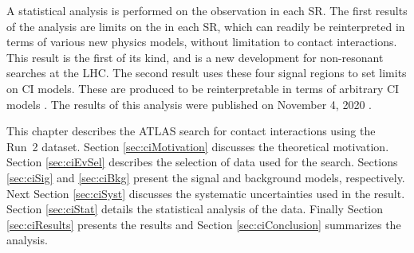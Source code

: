A statistical analysis is performed on the observation in each SR.
The first results of the analysis are limits on the \xsbr in each SR, which can readily be reinterpreted in terms of various new physics models, without limitation to contact interactions.
This result is the first of its kind, and is a new development for non-resonant searches at the LHC.
The second result uses these four signal regions to set limits on CI models.
These are produced to be reinterpretable in terms of arbitrary CI models \cite{chala}.
The results of this analysis were published on November 4, 2020 \cite{ciAaron}.

This chapter describes the ATLAS search for contact interactions using the Run~2 dataset.
Section \ref{sec:ciMotivation} discusses the theoretical motivation.
Section \ref{sec:ciEvSel} describes the selection of data used for the search.
Sections \ref{sec:ciSig} and \ref{sec:ciBkg} present the signal and background models, respectively.
Next Section \ref{sec:ciSyst} discusses the systematic uncertainties used in the result.
Section \ref{sec:ciStat} details the statistical analysis of the data.
Finally Section \ref{sec:ciResults} presents the results and Section \ref{sec:ciConclusion} summarizes the analysis.











